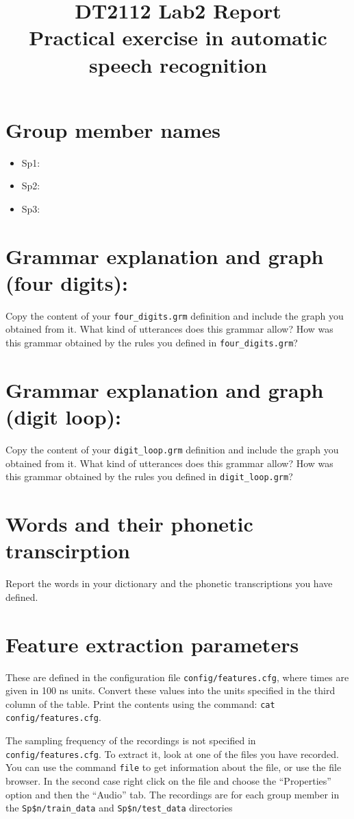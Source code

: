 \documentclass[onecolumn]{article}
\author{}
\date{}
\title{DT2112 Lab2 Report\\Practical exercise in automatic speech recognition}
\begin{document}
\maketitle
\section*{Group member names}
\begin{itemize}
\item Sp1:
\item Sp2:
\item Sp3:
\end{itemize}

\section*{Grammar explanation and graph (four digits):}
Copy the content of your \verb|four_digits.grm| definition and include the graph you obtained from it. What kind of utterances does this grammar allow? How was this grammar obtained by the rules you defined in \verb|four_digits.grm|?
\clearpage
\section*{Grammar explanation and graph (digit loop):}
Copy the content of your \verb|digit_loop.grm| definition and include the graph you obtained from it. What kind of utterances does this grammar allow? How was this grammar obtained by the rules you defined in \verb|digit_loop.grm|?
\vspace{0.5\textheight}

\section*{Words and their phonetic transcirption}
Report the words in your dictionary and the phonetic transcriptions you have defined.
\clearpage

\section*{Feature extraction parameters}
These are defined in the configuration file \verb|config/features.cfg|, where times are given in 100 ns units. Convert these values into the units specified in the third column of the table. Print the contents using the command: \verb|cat config/features.cfg|.

The sampling frequency of the recordings is not specified in \verb|config/features.cfg|. To extract it, look at one of the files you have recorded. You can use the command \verb|file| to get information about the file, or use the file browser. In the second case right click on the file and choose the ``Properties'' option and then the ``Audio'' tab. The recordings are for each group member in the \verb|Sp$n/train_data| and \verb|Sp$n/test_data| directories\\[5mm]
\end{document}
